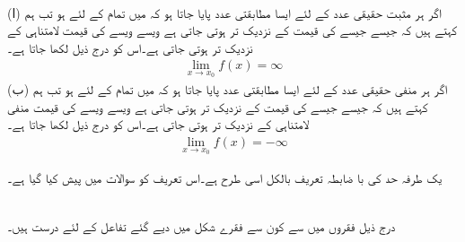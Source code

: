 \\
(ا)\quad
اگر ہر مثبت حقیقی عدد  کے لئے ایسا مطابقتی عدد  پایا جاتا ہو کہ   میں تمام  کے لئے  ہو تب ہم کہتے ہیں کہ جیسے جیسے  کی قیمت  کے نزدیک تر ہوتی جاتی ہے ویسے ویسے  کی قیمت لامتناہی کے نزدیک تر ہوتی جاتی ہے۔اس کو درج ذیل لکھا جاتا ہے۔
\begin{align*}
\lim_{x\to x_0} f(x)=\infty
\end{align*}   
(ب)\quad
اگر ہر منفی حقیقی عدد  کے لئے ایسا مطابقتی عدد  پایا جاتا ہو کہ   میں تمام  کے لئے  ہو تب ہم کہتے ہیں کہ جیسے جیسے  کی قیمت  کے نزدیک تر ہوتی جاتی ہے ویسے ویسے  کی قیمت منفی لامتناہی کے نزدیک تر ہوتی جاتی ہے۔اس کو درج ذیل لکھا جاتا ہے۔
\begin{align*}
\lim_{x\to x_0} f(x)=-\infty
\end{align*}  

یک طرفہ حد کی با ضابطہ تعریف بالکل اسی طرح ہے۔اس تعریف کو سوالات میں پیش کیا گیا ہے۔

\\
درج ذیل فقروں میں سے کون سے فقرے شکل  میں دیے گئے تفاعل  کے لئے درست ہیں۔


